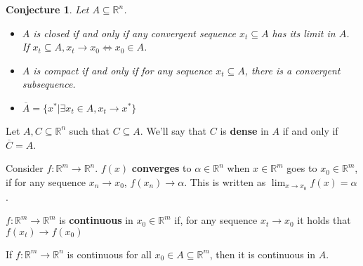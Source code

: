 \documentclass[aspectratio=169]{beamer}
\newtheorem{proposition}{Conjecture}[section]
\begin{document}
\begin{frame}

\begin{proposition}
    Let $A\subseteq\mathds{R}^n$.
    \begin{itemize}
        \item $A$ is closed if and only if any convergent sequence $x_t\subseteq A$ has its limit in $A$. If $x_t\subseteq A, x_t\rightarrow x_0\Leftrightarrow x_0\in A$.
        \item $A$ is compact if and only if for any sequence $x_t\subseteq A$, there is a convergent subsequence.
        \item $\overline{A}=\{x^*|\exists x_t\in A, x_t\rightarrow x^*\}$
    \end{itemize}
\end{proposition}
    
\end{frame}

\begin{frame}
    \begin{definition}
    Let $A,C\subseteq \mathds{R}^n$ such that $C\subseteq A$. We'll say that $C$ is \textbf{dense} in $A$ if and only if $\overline{C}=A$.
    \end{definition}
    
\end{frame}

\begin{frame}

    \begin{definition}
    Consider $f:\mathds{R}^m\rightarrow\mathds{R}^n$. $f(x)$ \textbf{converges} to $\alpha \in \mathds{R}^n$ when $x\in\mathds{R}^m$ goes to $x_0\in\mathds{R}^m$, if for any sequence $x_n\rightarrow x_0$, $f(x_n)\rightarrow \alpha$. This is written as $\lim_{x\rightarrow x_0} f(x)=\alpha$.
    \end{definition}
    
    \begin{definition}
    $f:\mathds{R}^m\rightarrow\mathds{R}^m$ is \textbf{continuous} in $x_0\in\mathds{R}^m$ if, for any sequence $x_t\rightarrow x_0$ it holds that $f(x_t)\rightarrow f(x_0)$
    \end{definition}
    
    \begin{definition}
     If $f:\mathds{R}^m\rightarrow \mathds{R}^n$ is continuous for all $x_0\in A\subseteq \mathds{R}^m$, then it is continuous in $A$.
    \end{definition}
\end{frame}
\end{document}
